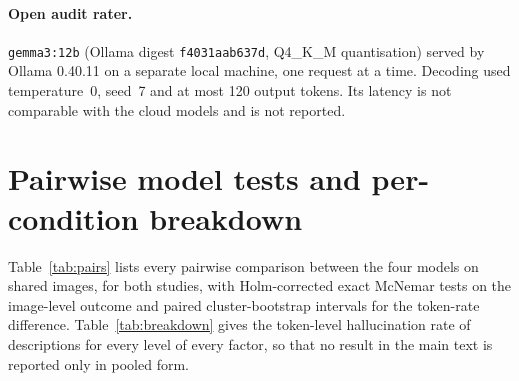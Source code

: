 \documentclass[pdflatex,sn-mathphys-num]{sn-jnl}%
\theoremstyle{thmstyleone}%
\theoremstyle{thmstyletwo}%
\theoremstyle{thmstylethree}%
\newcommand{\OllamaVersion}{0.40.11}
\begin{document}
\begin{appendices}
\paragraph{Open audit rater.} \texttt{gemma3:12b} (Ollama digest \texttt{f4031aab637d}, Q4\_K\_M quantisation) served by Ollama \OllamaVersion{} on a separate local machine, one request at a time. Decoding used temperature~0, seed~7 and at most 120 output tokens. Its latency is not comparable with the cloud models and is not reported.

\section{Pairwise model tests and per-condition breakdown}\label{secA2}

Table~\ref{tab:pairs} lists every pairwise comparison between the four models on shared images, for both studies, with Holm-corrected exact McNemar tests on the image-level outcome and paired cluster-bootstrap intervals for the token-rate difference. Table~\ref{tab:breakdown} gives the token-level hallucination rate of descriptions for every level of every factor, so that no result in the main text is reported only in pooled form.


\end{appendices}
\end{document}

